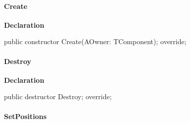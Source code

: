 \documentclass{report}
\newif\ifpdf
\begin{document}
\paragraph*{Create}\hspace*{\fill}

\label{swcatalog.TCTLEntry-Create}
\begin{list}{}{
\setlength{\itemindent}{0cm}
\setlength{\listparindent}{0cm}
\setlength{\leftmargin}{\evensidemargin}
\addtolength{\leftmargin}{\tmplength}
\settowidth{\labelsep}{X}
\addtolength{\leftmargin}{\labelsep}
\setlength{\labelwidth}{\tmplength}
}
\item[\textbf{Declaration}\hfill]
\ifpdf
\begin{flushleft}
\fi
\begin{ttfamily}
public constructor Create(AOwner: TComponent); override;\end{ttfamily}

\ifpdf
\end{flushleft}
\fi

\end{list}
\paragraph*{Destroy}\hspace*{\fill}

\label{swcatalog.TCTLEntry-Destroy}
\begin{list}{}{
\setlength{\itemindent}{0cm}
\setlength{\listparindent}{0cm}
\setlength{\leftmargin}{\evensidemargin}
\addtolength{\leftmargin}{\tmplength}
\settowidth{\labelsep}{X}
\addtolength{\leftmargin}{\labelsep}
\setlength{\labelwidth}{\tmplength}
}
\item[\textbf{Declaration}\hfill]
\ifpdf
\begin{flushleft}
\fi
\begin{ttfamily}
public destructor Destroy; override;\end{ttfamily}

\ifpdf
\end{flushleft}
\fi

\end{list}
\paragraph*{SetPositions}\hspace*{\fill}
\end{document}
